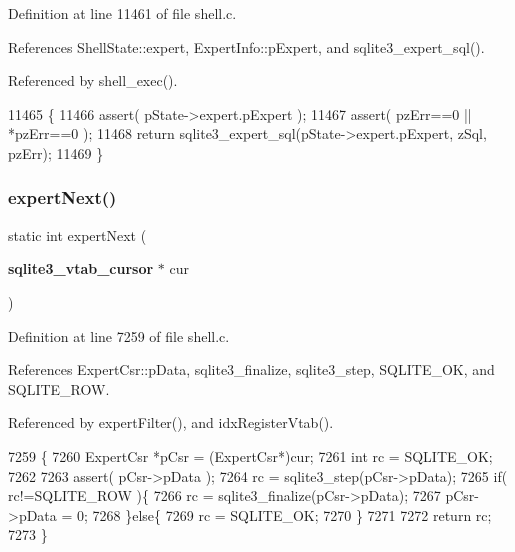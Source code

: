 Definition at line 11461 of file shell.\+c.



References Shell\+State\+::expert, Expert\+Info\+::p\+Expert, and sqlite3\+\_\+expert\+\_\+sql().



Referenced by shell\+\_\+exec().


\begin{DoxyCode}
11465  \{
11466   assert( pState->expert.pExpert );
11467   assert( pzErr==0 || *pzErr==0 );
11468   \textcolor{keywordflow}{return} sqlite3_expert_sql(pState->expert.pExpert, zSql, pzErr);
11469 \}
\end{DoxyCode}
\mbox{\label{shell_8c_a680204caf9ee77bf5affe1c56ed997c4}} 
\subsubsection{expert\+Next()}
{\footnotesize\ttfamily static int expert\+Next (\begin{DoxyParamCaption}\item[{\textbf{ sqlite3\+\_\+vtab\+\_\+cursor} $\ast$}]{cur }\end{DoxyParamCaption})\hspace{0.3cm}{\ttfamily [static]}}



Definition at line 7259 of file shell.\+c.



References Expert\+Csr\+::p\+Data, sqlite3\+\_\+finalize, sqlite3\+\_\+step, S\+Q\+L\+I\+T\+E\+\_\+\+OK, and S\+Q\+L\+I\+T\+E\+\_\+\+R\+OW.



Referenced by expert\+Filter(), and idx\+Register\+Vtab().


\begin{DoxyCode}
7259                                                \{
7260   ExpertCsr *pCsr = (ExpertCsr*)cur;
7261   \textcolor{keywordtype}{int} rc = SQLITE_OK;
7262 
7263   assert( pCsr->pData );
7264   rc = sqlite3_step(pCsr->pData);
7265   \textcolor{keywordflow}{if}( rc!=SQLITE_ROW )\{
7266     rc = sqlite3_finalize(pCsr->pData);
7267     pCsr->pData = 0;
7268   \}\textcolor{keywordflow}{else}\{
7269     rc = SQLITE_OK;
7270   \}
7271 
7272   \textcolor{keywordflow}{return} rc;
7273 \}
\end{DoxyCode}
\mbox{\label{shell_8c_a9e59dadc8de59b5ada8e57b111c2ff83}} 
